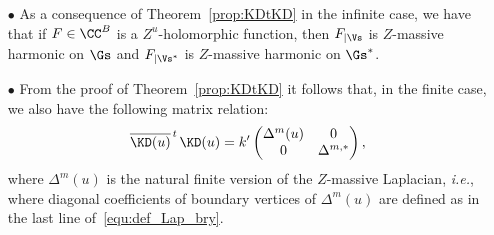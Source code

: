 \documentclass[a4paper,twoside,11pt]{article}
\begin{document}
\begin{rem}\label{rem:Lap}$\,$
\begin{itemize}
\item[$\bullet$] As a consequence of Theorem~\ref{prop:KDtKD} in the infinite case, we have that if $F\in\CC^B$ is a $Z^u$-holomorphic function, 
then $F_{|\Vs}$ is $Z$-massive harmonic on $\Gs$ and $F_{|\Vs^*}$ is $Z$-massive harmonic on $\Gs^*$.
\item[$\bullet$]
From the proof of Theorem~\ref{prop:KDtKD} it follows that, in the finite case, we also have the following matrix relation:
\begin{equation*} 
\overline{\KD(u)}^{\,t\,}\KD(u)=k'
\begin{pmatrix}
\Delta^{m}(u)& 0 \\
0&\Delta^{m,*}
\end{pmatrix},
\end{equation*} 
where $\Delta^{m}(u)$ is the natural finite version of the $Z$-massive Laplacian, \emph{i.e.}, where diagonal coefficients 
of boundary vertices of $\Delta^{m}(u)$ are defined as in the last line of~\eqref{equ:def_Lap_bry}.
\end{itemize}
\end{rem}
\end{document}
